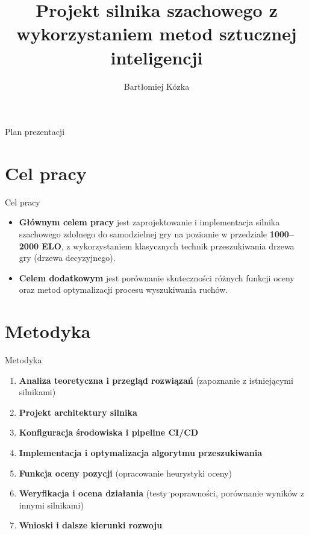 \documentclass[aspectratio=1610, english]{beamer}
\author[Bartłomiej Kózka]
{
		Bartłomiej Kózka
}
\date{}
\title[Silnik szachowy]
{
    Projekt silnika szachowego z wykorzystaniem metod sztucznej inteligencji
}
\begin{document}
\maketitle

\begin{frame}{Plan prezentacji}
	\tableofcontents
\end{frame}


\section{Cel pracy}

\begin{frame}{Cel pracy}
    \begin{itemize}
        \item \textbf{Głównym celem pracy} jest zaprojektowanie i implementacja silnika szachowego zdolnego do samodzielnej gry na poziomie w przedziale \textbf{1000–2000 ELO}, z wykorzystaniem klasycznych technik przeszukiwania drzewa gry (drzewa decyzyjnego).
        \newline
        \item \textbf{Celem dodatkowym} jest porównanie skuteczności różnych funkcji oceny oraz metod optymalizacji procesu wyszukiwania ruchów.
    \end{itemize}
\end{frame}



\section{Metodyka}
\begin{frame}{Metodyka}
    \begin{enumerate}
    \item \textbf{Analiza teoretyczna i przegląd rozwiązań} (zapoznanie z istniejącymi silnikami)
    
    \item \textbf{Projekt architektury silnika} %
    
    \item \textbf{Konfiguracja środowiska i pipeline CI/CD}

    \item \textbf{Implementacja i optymalizacja algorytmu przeszukiwania}
    
    \item \textbf{Funkcja oceny pozycji} (opracowanie heurystyki oceny)
        
    \item \textbf{Weryfikacja i ocena działania} (testy poprawności, porównanie wyników z innymi silnikami)
    
    \item \textbf{Wnioski i dalsze kierunki rozwoju}
    \end{enumerate}   

\end{frame}
\end{document}
